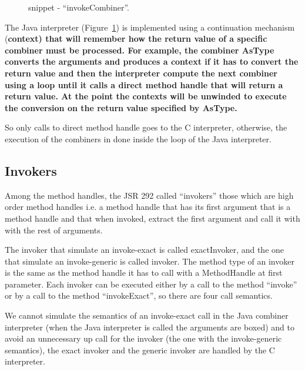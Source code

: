 \documentclass{sig-alternate}
\def \Jsr{JSR\xspace}
\def \JSR{\Jsr 292\xspace}
\begin{document}
      \begin{figure}[!h]
        \centering \vspace{-1em}
        \caption{snippet - ``invokeCombiner''.}
        \label{implINTERP}
      \end{figure}

      The Java interpreter (Figure~\ref{implINTERP}) is implemented using a continuation mechanism
      (\bf{context}) that will remember how the return value of a specific combiner must be processed.
      For example, the combiner AsType converts the arguments and produces a context if it has
      to convert the return value and then the interpreter compute the next combiner using a loop until it calls
      a direct method handle that will return a return value. At the point the contexts will be unwinded
      to execute the conversion on the return value specified by AsType. 

      So only calls to direct method handle goes to the C interpreter, otherwise, the execution of the combiners
      in done inside the loop of the Java interpreter.

    \subsection{Invokers}
     \label{invokers}

      Among the method handles, the \JSR called ``invokers'' those which are high order method handles i.e.
      a method handle that has its first argument that is a method handle and that when invoked,
      extract the first argument and call it with with the rest of arguments.

      The invoker that simulate an invoke-exact is called exactInvoker, and the one that simulate
      an invoke-generic is called invoker. The method type of an invoker is the same as the method handle
      it has to call with a MethodHandle at first parameter.
      Each invoker can be executed either by a call to the method ``invoke'' or by a call to the method ``invokeExact'',
      so there are four call semantics.
      
      We cannot simulate the semantics of an invoke-exact call in the Java combiner interpreter
      (when the Java interpreter is called the arguments are boxed) and to avoid an unnecessary up call
      for the invoker (the one with the invoke-generic semantics), the exact invoker and the generic invoker
      are handled by the C interpreter.
      
\end{document}
